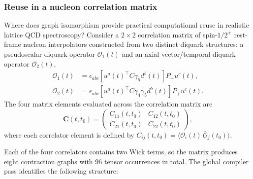 \documentclass[a4paper,fleqn]{cas-dc}
\begin{document}
\subsubsection{Reuse in a nucleon correlation matrix}
\label{sec:cross_correlator_isomorphism}

Where does graph isomorphism provide practical computational reuse in realistic lattice QCD spectroscopy? Consider a $2 \times 2$ correlation matrix of spin-$1/2^+$ rest-frame nucleon interpolators constructed from two distinct diquark structures: a pseudoscalar diquark operator \(\mathcal O_1(t)\) and an axial-vector/temporal diquark operator \(\mathcal O_2(t)\),
\begin{align}
\mathcal O_1(t) &= \epsilon_{abc} \left[ u^a(t)^\top C\gamma_5 d^b(t) \right] P_+ u^c(t), \label{eq:op1_nucleon}\\
\mathcal O_2(t) &= \epsilon_{abc} \left[ u^a(t)^\top C\gamma_4\gamma_5 d^b(t) \right] P_+ u^c(t). \label{eq:op2_nucleon}
\end{align}
The four matrix elements evaluated across the correlation matrix are
\begin{equation}
\mathbf C(t, t_0) = 
\begin{pmatrix}
C_{11}(t, t_0) & C_{12}(t, t_0) \\
C_{21}(t, t_0) & C_{22}(t, t_0)
\end{pmatrix},
\label{eq:nucleon_2x2_matrix}
\end{equation}
where each correlator element is defined by \(C_{ij}(t, t_0) = \langle \mathcal O_i(t) \, \overline{\mathcal O}_j(t_0) \rangle\).

Each of the four correlators contains two Wick terms, so the matrix produces eight contraction graphs
with 96 tensor occurrences in total. The global compiler pass identifies the following structure:
\end{document}
